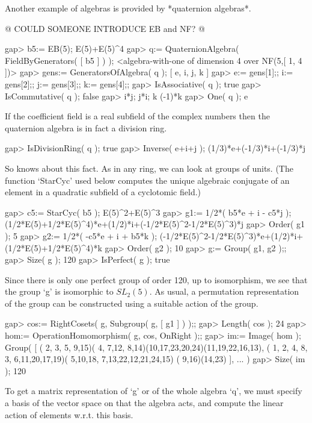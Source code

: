 Another example of algebras is provided by *quaternion algebras*.

@ COULD SOMEONE INTRODUCE EB and NF? @

\beginexample
    gap> b5:= EB(5);
    E(5)+E(5)^4
    gap> q:= QuaternionAlgebra( FieldByGenerators( [ b5 ] ) );
    <algebra-with-one of dimension 4 over NF(5,[ 1, 4 ])>
    gap> gens:= GeneratorsOfAlgebra( q );
    [ e, i, j, k ]
    gap> e:= gens[1];; i:= gens[2];; j:= gens[3];; k:= gens[4];;
    gap> IsAssociative( q );
    true
    gap> IsCommutative( q );
    false
    gap> i*j; j*i;
    k
    (-1)*k
    gap> One( q );
    e
\endexample

If the coefficient field is a real subfield of the complex numbers
then the quaternion algebra is in fact a division ring.

\beginexample
    gap> IsDivisionRing( q );
    true
    gap> Inverse( e+i+j );
    (1/3)*e+(-1/3)*i+(-1/3)*j
\endexample

So {\GAP} knows about this fact.
As in any ring, we can look at groups of units.
(The function `StarCyc' used below computes the unique algebraic
conjugate of an element in a quadratic subfield of a cyclotomic field.)

\beginexample
    gap> c5:= StarCyc( b5 );
    E(5)^2+E(5)^3
    gap> g1:= 1/2*( b5*e + i - c5*j );
    (1/2*E(5)+1/2*E(5)^4)*e+(1/2)*i+(-1/2*E(5)^2-1/2*E(5)^3)*j
    gap> Order( g1 );
    5
    gap> g2:= 1/2*( -c5*e + i + b5*k );
    (-1/2*E(5)^2-1/2*E(5)^3)*e+(1/2)*i+(1/2*E(5)+1/2*E(5)^4)*k
    gap> Order( g2 );
    10
    gap> g:= Group( g1, g2 );;
    gap> Size( g );
    120
    gap> IsPerfect( g );
    true
\endexample

Since there is only one perfect group of order 120, up to isomorphism,
we see that the group `g' is isomorphic to $SL_2(5)$.
As usual, a permutation representation of the group can be constructed
using a suitable action of the group.

\beginexample
    gap> cos:= RightCosets( g, Subgroup( g, [ g1 ] ) );;
    gap> Length( cos );
    24
    gap> hom:= OperationHomomorphism( g, cos, OnRight );;
    gap> im:= Image( hom );
    Group( 
    [ ( 2, 3, 5, 9,15)( 4, 7,12, 8,14)(10,17,23,20,24)(11,19,22,16,13),
      ( 1, 2, 4, 8, 3, 6,11,20,17,19)( 5,10,18, 7,13,22,12,21,24,15)
        ( 9,16)(14,23) ], ... )
    gap> Size( im );
    120
\endexample

To get a matrix representation of `g' or of the whole algebra `q',
we must specify a basis of the vector space on that the algebra acts,
and compute the linear action of elements w.r.t. this basis.

